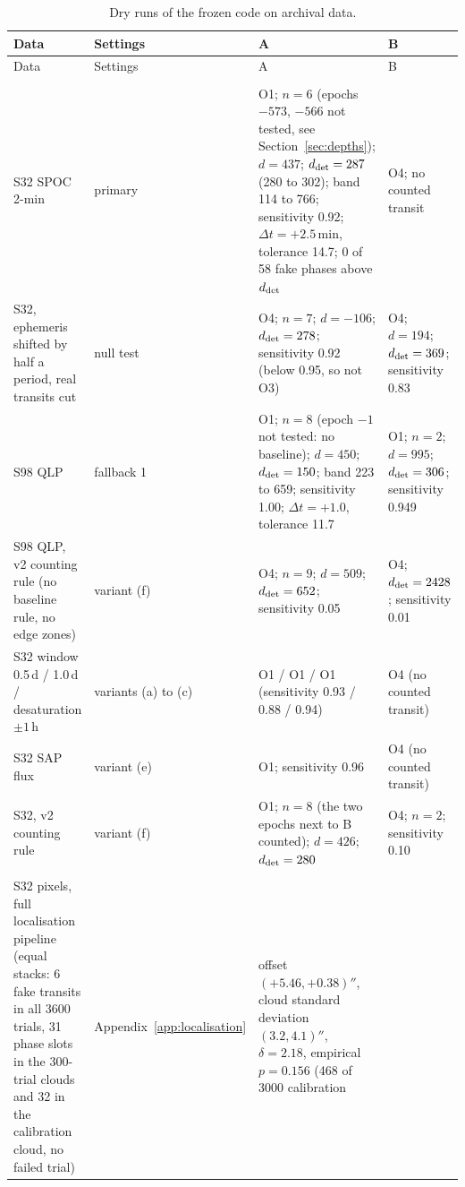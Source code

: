 \begin{longtable}{>{\raggedright\arraybackslash}p{}>{\raggedright\arraybackslash}p{}>{\raggedright\arraybackslash}p{}>{\raggedright\arraybackslash}p{}}
\caption{Dry runs of the frozen code on archival data.\label{tab:dryruns}}\\
\toprule
Data & Settings & A & B \\
\midrule
\endfirsthead
\toprule
Data & Settings & A & B \\
\midrule
\endhead
\multicolumn{4}{l}{\textit{Photometric test}} \\
S32 SPOC 2-min & primary & O1; $n = 6$ (epochs $-573$, $-566$ not tested, see Section~\ref{sec:depths}); $d = 437$;
  $d_{\rm det} = 287$ (280 to 302); band 114 to 766; sensitivity 0.92; $\Delta t = +2.5$\,min, tolerance 14.7; 0 of 58 fake
  phases above $d_{\rm det}$ & O4; no counted transit \\
S32, ephemeris shifted by half a period, real transits cut & null test & O4; $n = 7$; $d = -106$; $d_{\rm det} = 278$;
  sensitivity 0.92 (below 0.95, so not O3) & O4; $d = 194$; $d_{\rm det} = 369$; sensitivity 0.83 \\
S98 QLP & fallback 1 & O1; $n = 8$ (epoch $-1$ not tested: no baseline); $d = 450$; $d_{\rm det} = 150$; band 223 to 659;
  sensitivity 1.00; $\Delta t = +1.0$, tolerance 11.7 & O1; $n = 2$; $d = 995$; $d_{\rm det} = 306$; sensitivity 0.949 \\
S98 QLP, v2 counting rule (no baseline rule, no edge zones) & variant (f) & O4; $n = 9$; $d = 509$; $d_{\rm det} = 652$;
  sensitivity 0.05 & O4; $d_{\rm det} = 2428$; sensitivity 0.01 \\
S32 window 0.5\,d / 1.0\,d / desaturation $\pm 1$\,h & variants (a) to (c) & O1 / O1 / O1 (sensitivity 0.93 / 0.88 /
  0.94) & O4 (no counted transit) \\
S32 SAP flux & variant (e) & O1; sensitivity 0.96 & O4 (no counted transit) \\
S32, v2 counting rule & variant (f) & O1; $n = 8$ (the two epochs next to B counted); $d = 426$; $d_{\rm det} = 280$ & O4;
  $n = 2$; sensitivity 0.10 \\
\midrule
\multicolumn{4}{l}{\textit{Pixel localisation}} \\
S32 pixels, full localisation pipeline (equal stacks: 6 fake transits in all 3600 trials, 31 phase slots in the
  300-trial clouds and 32 in the calibration cloud, no failed trial) & Appendix~\ref{app:localisation} & offset $(+5.46,
  +0.38)''$, cloud standard deviation $(3.2, 4.1)''$, $\delta = 2.18$, empirical $p = 0.156$ (468 of 3000 calibration

\end{longtable}
